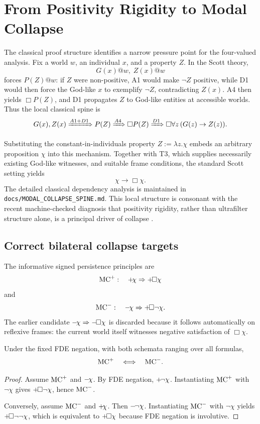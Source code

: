 \section{From Positivity Rigidity to Modal Collapse}
\label{sec:collapse}

The classical proof structure identifies a narrow pressure point for the four-valued analysis. Fix a world \(w\), an individual \(x\), and a property \(Z\). In the Scott theory,
\[
  G(x)@w,\; Z(x)@w
\]
forces \(P(Z)@w\): if \(Z\) were non-positive, A1 would make \(\neg Z\) positive, while D1 would then force the God-like \(x\) to exemplify \(\neg Z\), contradicting \(Z(x)\). A4 then yields \(\Box P(Z)\), and D1 propagates \(Z\) to God-like entities at accessible worlds. Thus the local classical spine is
\[
  G(x),Z(x)
  \xRightarrow{A1+D1} P(Z)
  \xRightarrow{A4} \Box P(Z)
  \xRightarrow{D1} \Box\forall z\,(G(z)\rightarrow Z(z)).
\]

Substituting the constant-in-individuals property \(Z:=\lambda z.\chi\) embeds an arbitrary proposition \(\chi\) into this mechanism. Together with T3, which supplies necessarily existing God-like witnesses, and suitable frame conditions, the standard Scott setting yields
\[
  \chi\rightarrow\Box\chi.
\]
The detailed classical dependency analysis is maintained in \texttt{docs/MODAL\_COLLAPSE\_SPINE.md}. This local structure is consonant with the recent machine-checked diagnosis that positivity rigidity, rather than ultrafilter structure alone, is a principal driver of collapse \cite{Benzmueller2026Collapse}.

\subsection{Correct bilateral collapse targets}

The informative signed persistence principles are
\[
  \mathrm{MC}^{+}:\quad +\!\chi\Rightarrow+\!\Box\chi
\]
and
\[
  \mathrm{MC}^{-}:\quad -\!\chi\Rightarrow+\!\Box\neg\chi.
\]
The earlier candidate \(-\!\chi\Rightarrow-\!\Box\chi\) is discarded because it follows automatically on reflexive frames: the current world itself witnesses negative satisfaction of \(\Box\chi\).

\begin{theorem}
Under the fixed FDE negation, with both schemata ranging over all formulas,
\[
  \mathrm{MC}^{+}\quad\Longleftrightarrow\quad\mathrm{MC}^{-}.
\]
\end{theorem}
\begin{proof}
Assume \(\mathrm{MC}^{+}\) and \(-\!\chi\). By FDE negation, \(+\!\neg\chi\). Instantiating \(\mathrm{MC}^{+}\) with \(\neg\chi\) gives \(+\!\Box\neg\chi\), hence \(\mathrm{MC}^{-}\).

Conversely, assume \(\mathrm{MC}^{-}\) and \(+\!\chi\). Then \(-\!\neg\chi\). Instantiating \(\mathrm{MC}^{-}\) with \(\neg\chi\) yields \(+\!\Box\neg\neg\chi\), which is equivalent to \(+\!\Box\chi\) because FDE negation is involutive.
\end{proof}

